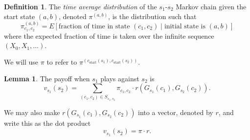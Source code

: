 \documentclass[11pt]{amsart}
\theoremstyle{definition}
\newtheorem{definition}[theorem]{Definition}
\newtheorem{lemma}[theorem]{Lemma}
\theoremstyle{remark}
\begin{document}
\begin{definition}
  \label{timeaveragedistribution}
  The \textit{time average distribution} of the $s_1$-$s_2$ Markov chain given the start state $(a, b)$, denoted $\pi^{(a, b)}$, is the distribution such that \begin{equation*}
    \pi_{c_1, c_2}^{(a, b)} = E \left[ \text{fraction of time in state $(c_1,c_2)$} \mid \text{initial state is } (a, b)  \right]
  \end{equation*}
  where the expected fraction of time is taken over the infinite sequence $(X_0, X_1, \ldots)$.
\end{definition}

We will use $\pi$ to refer to $\pi^{(c_{\text{start}}(s_1), c_\text{start}(s_2))}$.

\begin{lemma}
  \label{payofftimeaverage}
  The payoff when $s_1$ plays against $s_2$ is
  \begin{equation*}
    v_{s_1}(s_2) = \sum_{(c_1,c_2) \in S_{s_1,s_2}} \pi_{c_1,c_2} \cdot r(G_{s_1}(c_1),G_{s_2}(c_2)).
  \end{equation*}
\end{lemma}

We may also make $r(G_{s_1}(c_1),G_{s_2}(c_2))$ into a vector, denoted by $r$, and write this as the dot product \begin{equation*}
  v_{s_1}(s_2) = \pi \cdot r.
\end{equation*}

\end{document}

